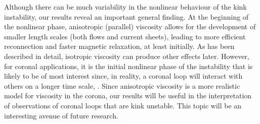 Although there can be much variability in the nonlinear behaviour of the kink instability, our results reveal an important general finding. At the beginning of the nonlinear phase, anisotropic (parallel) viscosity allows for the development of smaller length scales (both flows and current sheets),  leading to more efficient reconnection and faster magnetic relaxation, at least initially. As has been described in detail, isotropic viscosity can produce other effects later. However, for coronal applications, it is the initial nonlinear phase of the instability that is likely to be of most interest since, in reality, a coronal loop will interact with others on a longer time scale, . Since anisotropic viscosity is a more realistic model for viscosity in the corona, our results will be useful in the interpretation of observations of coronal loops that are kink unstable. This topic will be an interesting avenue of future research.

